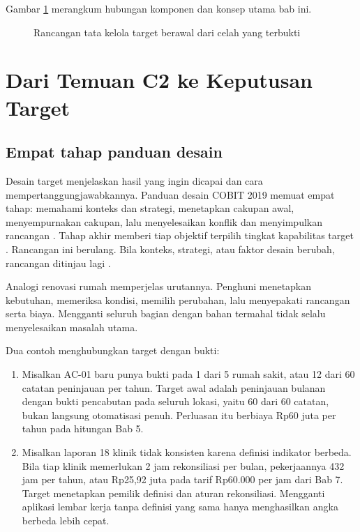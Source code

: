 Gambar \ref{fig:ch08-ilustrasi-bab} merangkum hubungan komponen dan konsep utama bab ini.
\begin{figure}[!htb]
  \centering
  
  \caption{Rancangan tata kelola target berawal dari celah yang terbukti}
  \label{fig:ch08-ilustrasi-bab}
\end{figure}

\section{Dari Temuan C2 ke Keputusan Target}

\subsection*{Empat tahap panduan desain}

Desain target menjelaskan hasil yang ingin dicapai dan cara mempertanggungjawabkannya. Panduan
desain COBIT 2019 memuat empat tahap: memahami konteks dan strategi, menetapkan cakupan awal,
menyempurnakan cakupan, lalu menyelesaikan konflik dan menyimpulkan rancangan
\cite{c08-isaca-press}. Tahap akhir memberi tiap objektif terpilih tingkat kapabilitas target
\cite{c04-kapabilitas}. Rancangan ini berulang. Bila konteks, strategi, atau faktor desain
berubah, rancangan ditinjau lagi \cite{c08-grijp2019}.

Analogi renovasi rumah memperjelas urutannya. Penghuni menetapkan kebutuhan, memeriksa kondisi,
memilih perubahan, lalu menyepakati rancangan serta biaya. Mengganti seluruh bagian dengan bahan
termahal tidak selalu menyelesaikan masalah utama.

Dua contoh menghubungkan target dengan bukti:
\begin{enumerate}
  \item Misalkan AC-01 baru punya bukti pada 1 dari 5 rumah sakit, atau 12 dari 60 catatan
  peninjauan per tahun. Target awal adalah peninjauan bulanan dengan bukti pencabutan pada
  seluruh lokasi, yaitu 60 dari 60 catatan, bukan langsung otomatisasi penuh. Perluasan itu
  berbiaya Rp60 juta per tahun pada hitungan Bab 5.
  \item Misalkan laporan 18 klinik tidak konsisten karena definisi indikator berbeda. Bila tiap
  klinik memerlukan 2 jam rekonsiliasi per bulan, pekerjaannya 432 jam per tahun, atau Rp25,92
  juta pada tarif Rp60.000 per jam dari Bab 7. Target menetapkan pemilik definisi dan aturan
  rekonsiliasi. Mengganti aplikasi lembar kerja tanpa definisi yang sama hanya menghasilkan
  angka berbeda lebih cepat.
\end{enumerate}


